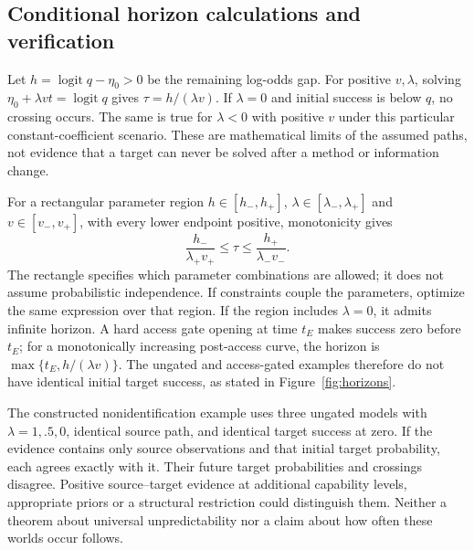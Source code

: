 \subsection{Conditional horizon calculations and verification}
\label{app:horizonproofs}
Let $h=\operatorname{logit}q-\eta_0>0$ be the remaining log-odds gap. For positive $v,\lambda$, solving $\eta_0+\lambda vt=\operatorname{logit}q$ gives $\tau=h/(\lambda v)$. If $\lambda=0$ and initial success is below $q$, no crossing occurs. The same is true for $\lambda<0$ with positive $v$ under this particular constant-coefficient scenario. These are mathematical limits of the assumed paths, not evidence that a target can never be solved after a method or information change.

For a rectangular parameter region $h\in[h_-,h_+]$, $\lambda\in[\lambda_-,\lambda_+]$ and $v\in[v_-,v_+]$, with every lower endpoint positive, monotonicity gives
\begin{equation}
 \frac{h_-}{\lambda_+v_+}\le\tau\le\frac{h_+}{\lambda_-v_-}.
 \label{eq:horizoninterval}
\end{equation}
The rectangle specifies which parameter combinations are allowed; it does not assume probabilistic independence. If constraints couple the parameters, optimize the same expression over that region. If the region includes $\lambda=0$, it admits infinite horizon. A hard access gate opening at time $t_E$ makes success zero before $t_E$; for a monotonically increasing post-access curve, the horizon is $\max\{t_E,h/(\lambda v)\}$. The ungated and access-gated examples therefore do not have identical initial target success, as stated in Figure~\ref{fig:horizons}.

The constructed nonidentification example uses three ungated models with $\lambda=1,.5,0$, identical source path, and identical target success at zero. If the evidence contains only source observations and that initial target probability, each agrees exactly with it. Their future target probabilities and crossings disagree. Positive source--target evidence at additional capability levels, appropriate priors or a structural restriction could distinguish them. Neither a theorem about universal unpredictability nor a claim about how often these worlds occur follows.

